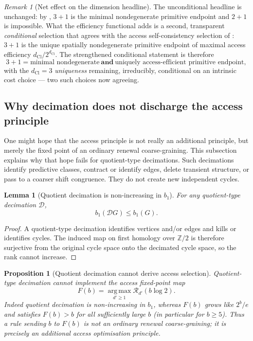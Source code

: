\documentclass[11pt]{article}
\newtheorem{proposition}[theorem]{Proposition}
\newtheorem{lemma}[theorem]{Lemma}
\theoremstyle{definition}
\theoremstyle{remark}
\newtheorem{remark}[theorem]{Remark}
\newcommand{\Z}{\mathbb{Z}}
\newcommand{\Acc}{\mathcal{R}}
\newcommand{\argmax}{\operatorname*{arg\,max}}
\newcommand{\dCl}{d_{\mathrm{Cl}}}
\begin{document}
\begin{remark}[Net effect on the dimension headline]
\label{rem:efficiency-headline}
The unconditional headline is unchanged: by
, \(3+1\) is the minimal nondegenerate
primitive endpoint and \(2+1\) is impossible.  What the efficiency functional adds
is a second, transparent \emph{conditional} selection that agrees with the access
self-consistency selection of : \(3+1\) is the
unique spatially nondegenerate primitive endpoint of maximal access efficiency
\(\dCl/2^{\dCl}\).  The strengthened conditional statement is therefore
\[
  3+1=\text{minimal nondegenerate}\ \textbf{and}\ \text{uniquely access-efficient
  primitive endpoint},
\]
with the \(\dCl=3\) \emph{uniqueness} remaining, irreducibly, conditional on an
intrinsic cost choice --- two such choices now agreeing.
\end{remark}


\subsection{Why decimation does not discharge the access principle}
\label{subsec:decimation-limits}

One might hope that the access principle is not really an additional principle,
but merely the fixed point of an ordinary renewal coarse-graining.  This
subsection explains why that hope fails for quotient-type decimations.  Such
decimations identify predictive classes, contract or identify edges, delete
transient structure, or pass to a coarser shift congruence.  They do not create
new independent cycles.

\begin{lemma}[Quotient decimation is non-increasing in \(b_1\)]
\label{lem:quotient-decimation}
For any quotient-type decimation \(\mathcal D\),
\[
  b_1(\mathcal DG)\le b_1(G).
\]
\end{lemma}

\begin{proof}
A quotient-type decimation identifies vertices and/or edges and kills or
identifies cycles.  The induced map on first homology over \(\Z/2\) is therefore
surjective from the original cycle space onto the decimated cycle space, so the
rank cannot increase.
\end{proof}

\begin{proposition}[Quotient decimation cannot derive access selection]
\label{prop:decimation-cannot-access}
Quotient-type decimation cannot implement the access fixed-point map
\[
  F(b)=\argmax_{d'\ge1}\Acc_{d'}(b\log2).
\]
Indeed quotient decimation is non-increasing in \(b_1\), whereas \(F(b)\) grows
like \(2^b/e\) and satisfies \(F(b)>b\) for all sufficiently large \(b\) (in
particular for \(b\ge5\)).  Thus a rule sending \(b\) to \(F(b)\) is not an
ordinary renewal coarse-graining; it is precisely an additional access
optimisation principle.
\end{proposition}
\end{document}
